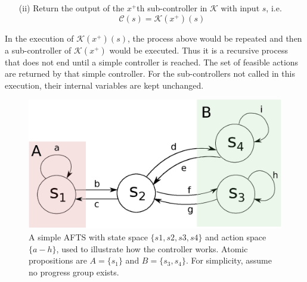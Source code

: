 \begin{definition}
\begin{itemize}
		\item[(ii)] Return the output of the $ x^+ $th sub-controller in $ \mathcal{K} $ with input $ s $, i.e.
		\begin{displaymath}
		\mathcal{C}(s) = \mathcal{K}(x^+)(s)
		\end{displaymath}
	\end{itemize}
	
	In the execution of $ \mathcal{K}(x^+)(s) $, the process above would be repeated and then a sub-controller of $ \mathcal{K}(x^+) $ would be executed. Thus it is a recursive process that does not end until a simple controller is reached.
	The set of feasible actions are returned by that simple controller. For the sub-controllers not called in this execution, their internal variables are kept unchanged.
	
	
	\label{def:exec}
\end{definition}


\begin{figure}
	\centering
	\includegraphics[width=0.4\linewidth]{pic/eg1}
	\caption{A simple AFTS with state space $\{s1,s2,s3,s4\}$ and action space $\{a-h\}$, used to illustrate how the controller works. Atomic propositions are $ A =\{s_1\} $ and $ B=\{s_3, s_4\} $. For simplicity, assume no progress group exists.}  
	\label{fig:eg1}
\end{figure}

